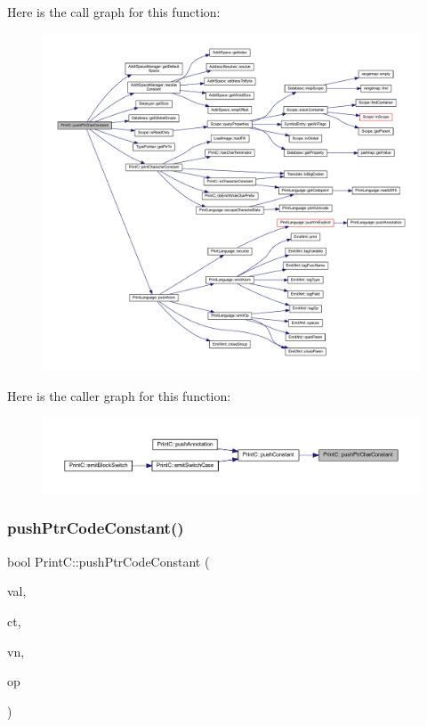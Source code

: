 Here is the call graph for this function\+:
\nopagebreak
\begin{figure}[H]
\begin{center}
\leavevmode
\includegraphics[width=350pt]{class_print_c_ac3096b61ae4a7d0e78200fa946c54a95_cgraph}
\end{center}
\end{figure}
Here is the caller graph for this function\+:
\nopagebreak
\begin{figure}[H]
\begin{center}
\leavevmode
\includegraphics[width=350pt]{class_print_c_ac3096b61ae4a7d0e78200fa946c54a95_icgraph}
\end{center}
\end{figure}
\mbox{\label{class_print_c_a60411f32d6cb0b986eb1f1f39296a529}} 
\subsubsection{\texorpdfstring{pushPtrCodeConstant()}{pushPtrCodeConstant()}}
{\footnotesize\ttfamily bool Print\+C\+::push\+Ptr\+Code\+Constant (\begin{DoxyParamCaption}\item[{\mbox{\hyperlink{types_8h_a2db313c5d32a12b01d26ac9b3bca178f}{uintb}}}]{val,  }\item[{const \mbox{\hyperlink{class_type_pointer}{Type\+Pointer}} $\ast$}]{ct,  }\item[{const \mbox{\hyperlink{class_varnode}{Varnode}} $\ast$}]{vn,  }\item[{const \mbox{\hyperlink{class_pcode_op}{Pcode\+Op}} $\ast$}]{op }\end{DoxyParamCaption})\hspace{0.3cm}{\ttfamily [protected]}}



